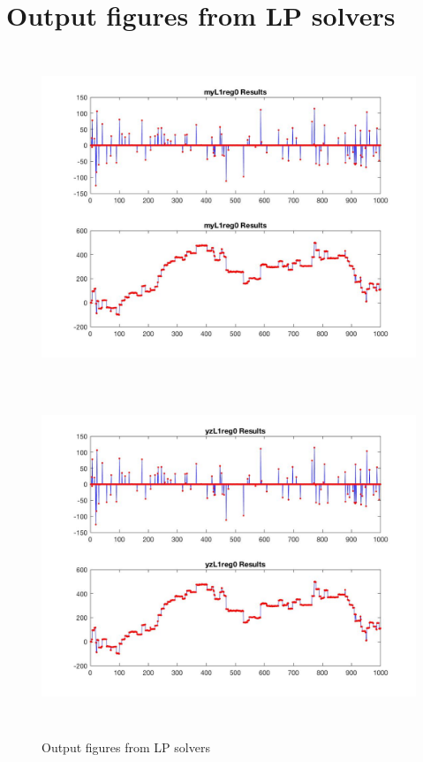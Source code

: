 \section*{Output figures from LP solvers}
\begin{figure}[H]
\centering
\includegraphics[height=10cm]{Output_1}
\includegraphics[height=10cm]{Output_2}
\caption{Output figures from LP solvers}
\end{figure}
\clearpage
